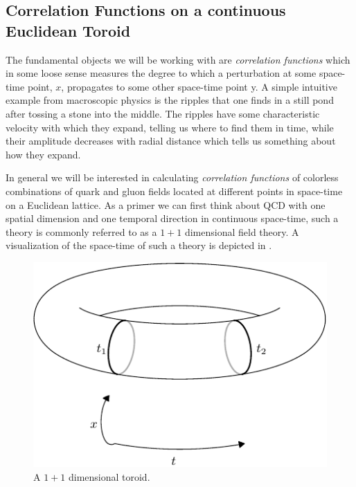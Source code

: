 
\subsection{Correlation Functions on a continuous Euclidean Toroid} \label{QCD::correlators}

The fundamental objects we will be working with are \emph{correlation functions} which in some loose sense measures the degree to which a perturbation at some space-time point, $x$, propagates to some other space-time point y.  A simple intuitive example from macroscopic physics is the ripples that one finds in a still pond after tossing a stone into the middle. The ripples have some characteristic velocity with which they expand, telling us where to find them in time, while their amplitude decreases with radial distance which tells us something about how they expand. 

In general we will be interested in calculating \emph{correlation functions} of colorless combinations of quark and gluon fields located at different points in space-time on a Euclidean lattice. As a primer we can first think about QCD with one spatial dimension and one temporal direction in continuous space-time, such a theory is commonly referred to as a $1+1$ dimensional field theory. A visualization of the space-time of such a theory is depicted in . 

\begin{figure}[htbp]
\centering
\includegraphics[width=0.8\linewidth]{figures/lattice_toroid/lattice_toroid.pdf}
\caption{ A $1+1$ dimensional toroid. \label{fig::QCD_1p1_lattice}}
\end{figure}

